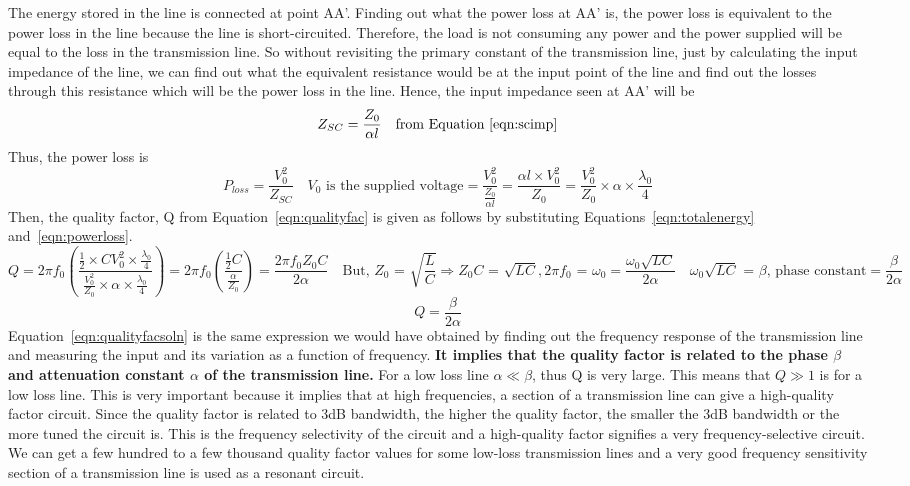 The energy stored in the line is connected at point AA'. Finding out what the power loss at AA' is, the power loss is equivalent to the power loss in the line because the line is short-circuited. Therefore, the load is not consuming any power and the power supplied will be equal to the loss in the transmission line. So without revisiting the primary constant of the transmission line, just by calculating the input impedance of the line, we can find out what the equivalent resistance would be at the input point of the line and find out the losses through this resistance which will be the power loss in the line. Hence, the input impedance seen at AA' will be
\begin{equation*}
Z_{SC} = \frac{Z_0}{\alpha l}\quad\text{from Equation~\eqref{eqn:scimp}}
\end{equation*}
Thus, the power loss is
\begin{dmath}
P_{loss} = \frac{V_0^{2}}{Z_{SC}}\quad V_0\text{ is the supplied voltage}
= \frac{V_0^{2}}{\frac{Z_0}{\alpha l}}
= \frac{\alpha l\times V_0^2}{Z_0}
= \frac{V_0^{2}}{Z_0}\times\alpha \times\frac{\lambda_{0}}{4}
\label{eqn:powerloss}
\end{dmath}
Then, the quality factor, Q from Equation~\eqref{eqn:qualityfac} is given as follows by substituting Equations~\eqref{eqn:totalenergy} and~\eqref{eqn:powerloss}.
\begin{dmath*}
Q = 2 \pi f_0\left(\frac{\frac{1}{2}\times CV_0^{2}\times\frac{\lambda_{0}}{4}}{\frac{V_0^{2}}{Z_0}\times\alpha \times\frac{\lambda_{0}}{4}}\right)
= 2 \pi f_0\left(\frac{\frac{1}{2}C}{\frac{\alpha}{Z_0}}\right)
= \frac{2 \pi f_0 Z_0C}{2\alpha}\quad\text{But, }Z_0\text{ = }\sqrt{\frac{L}{C}}\Rightarrow Z_0C\text{ = }\sqrt{LC}, 2\pi f_0\text{ = }\omega_{0}
= \frac{\omega_{0}\sqrt{LC}}{2 \alpha}\quad\omega_{0}\sqrt{LC}\text{ = }\beta\text{, phase constant}
= \frac{\beta}{2 \alpha}
\end{dmath*}
\begin{equation}
Q = \frac{\beta}{2 \alpha}
\label{eqn:qualityfacsoln}
\end{equation}
Equation~\eqref{eqn:qualityfacsoln} is the same expression we would have obtained by finding out the frequency response of the transmission line and measuring the input and its variation as a function of frequency. \textbf{It implies that the quality factor is related to the phase $\beta$ and attenuation constant $ \alpha$ of the transmission line.} For a low loss line $ \alpha \ll \beta$, thus Q is very large. This means that $Q \gg 1$ is for a low loss line. This is very important because it implies that at high frequencies, a section of a transmission line can give a high-quality factor circuit. Since the quality factor is related to 3dB bandwidth, the higher the quality factor, the smaller the 3dB bandwidth or the more tuned the circuit is. This is the frequency selectivity of the circuit and a high-quality factor signifies a very frequency-selective circuit. We can get a few hundred to a few thousand quality factor values for some low-loss transmission lines and a very good frequency sensitivity section of a transmission line is used as a resonant circuit.

